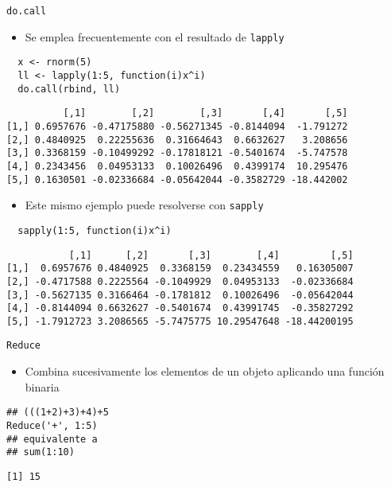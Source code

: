 \documentclass[xcolor={usenames,svgnames,dvipsnames}]{beamer}
\begin{document}
\begin{frame}[fragile,label={sec:orgheadline32}]{\texttt{do.call}}
 \begin{itemize}
\item Se emplea frecuentemente con el resultado de \texttt{lapply}
\end{itemize}
\lstset{language=R,label= ,caption= ,captionpos=b,numbers=none}
\begin{lstlisting}
  x <- rnorm(5)
  ll <- lapply(1:5, function(i)x^i)
  do.call(rbind, ll)
\end{lstlisting}

\begin{verbatim}
          [,1]        [,2]        [,3]       [,4]       [,5]
[1,] 0.6957676 -0.47175880 -0.56271345 -0.8144094  -1.791272
[2,] 0.4840925  0.22255636  0.31664643  0.6632627   3.208656
[3,] 0.3368159 -0.10499292 -0.17818121 -0.5401674  -5.747578
[4,] 0.2343456  0.04953133  0.10026496  0.4399174  10.295476
[5,] 0.1630501 -0.02336684 -0.05642044 -0.3582729 -18.442002
\end{verbatim}

\begin{itemize}
\item Este mismo ejemplo puede resolverse con \texttt{sapply}
\end{itemize}
\lstset{language=R,label= ,caption= ,captionpos=b,numbers=none}
\begin{lstlisting}
  sapply(1:5, function(i)x^i)
\end{lstlisting}

\begin{verbatim}
           [,1]      [,2]       [,3]        [,4]         [,5]
[1,]  0.6957676 0.4840925  0.3368159  0.23434559   0.16305007
[2,] -0.4717588 0.2225564 -0.1049929  0.04953133  -0.02336684
[3,] -0.5627135 0.3166464 -0.1781812  0.10026496  -0.05642044
[4,] -0.8144094 0.6632627 -0.5401674  0.43991745  -0.35827292
[5,] -1.7912723 3.2086565 -5.7475775 10.29547648 -18.44200195
\end{verbatim}
\end{frame}

\begin{frame}[fragile,label={sec:orgheadline33}]{\texttt{Reduce}}
 \begin{itemize}
\item Combina sucesivamente los elementos de un objeto aplicando una
función binaria
\end{itemize}
\lstset{language=R,label= ,caption= ,captionpos=b,numbers=none}
\begin{lstlisting}
## (((1+2)+3)+4)+5
Reduce('+', 1:5)
## equivalente a 
## sum(1:10)
\end{lstlisting}

\begin{verbatim}
[1] 15
\end{verbatim}
\end{frame}
\end{document}
